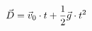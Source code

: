 \documentclass[preview]{standalone}
\begin{document}
\begin{align*}
\special{dvisvgm:raw <g id='unique000'>}\vec{D}=\vec{v}_0\cdot t+\frac{1}{2}\vec{g}\cdot t^2\special{dvisvgm:raw </g>}
\end{align*}
\end{document}
